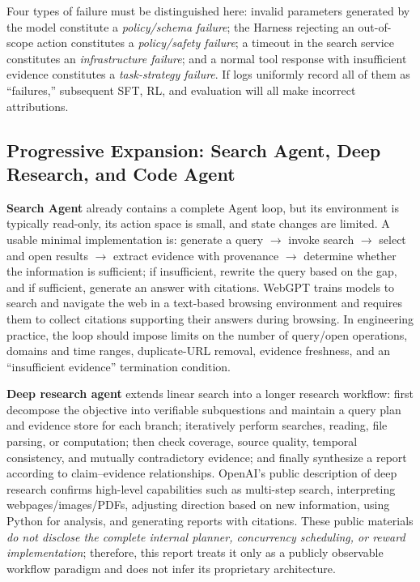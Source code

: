 \documentclass[10pt,a4paper,UTF8,fontset=none]{ctexart}
\begin{document}
Four types of failure must be distinguished here: invalid parameters generated by the model constitute a \emph{policy/schema failure}; the Harness rejecting an out-of-scope action constitutes a \emph{policy/safety failure}; a timeout in the search service constitutes an \emph{infrastructure failure}; and a normal tool response with insufficient evidence constitutes a \emph{task-strategy failure}. If logs uniformly record all of them as ``failures,'' subsequent SFT, RL, and evaluation will all make incorrect attributions.

\subsection{Progressive Expansion: Search Agent, Deep Research, and Code Agent}

\textbf{Search Agent} already contains a complete Agent loop, but its environment is typically read-only, its action space is small, and state changes are limited. A usable minimal implementation is: generate a query $\rightarrow$ invoke search $\rightarrow$ select and open results $\rightarrow$ extract evidence with provenance $\rightarrow$ determine whether the information is sufficient; if insufficient, rewrite the query based on the gap, and if sufficient, generate an answer with citations. WebGPT trains models to search and navigate the web in a text-based browsing environment and requires them to collect citations supporting their answers during browsing\cite{en:nakano2021webgpt}. In engineering practice, the loop should impose limits on the number of query/open operations, domains and time ranges, duplicate-URL removal, evidence freshness, and an ``insufficient evidence'' termination condition.

\textbf{Deep research agent} extends linear search into a longer research workflow: first decompose the objective into verifiable subquestions and maintain a query plan and evidence store for each branch; iteratively perform searches, reading, file parsing, or computation; then check coverage, source quality, temporal consistency, and mutually contradictory evidence; and finally synthesize a report according to claim--evidence relationships. OpenAI's public description of deep research confirms high-level capabilities such as multi-step search, interpreting webpages/images/PDFs, adjusting direction based on new information, using Python for analysis, and generating reports with citations\cite{en:openai2025deepresearch}. These public materials \emph{do not disclose the complete internal planner, concurrency scheduling, or reward implementation}; therefore, this report treats it only as a publicly observable workflow paradigm and does not infer its proprietary architecture.
\end{document}
